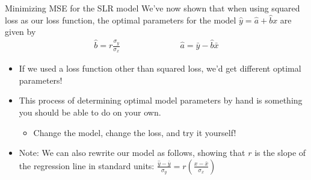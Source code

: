 \documentclass[aspectratio=169]{../latex_main/tntbeamer}  %
\begin{document}
	
	\begin{frame}{Minimizing MSE for the SLR model}
	       We’ve now shown that when using squared loss as our loss function, the optimal parameters for the model            $\hat{y} = \hat{a} + \hat{b}x$        are given by
                \begin{align*}
	                \hat{b} = r\frac{\sigma_y}{\sigma_x}
	                \hspace{3cm}
	                \hat{a} = \bar{y} - \hat{b}\bar{x}
                 \end{align*}

            	\begin{itemize}
            	    \item If we used a loss function other than squared loss, we’d get different optimal parameters!
            	    \item This process of determining optimal model parameters by hand is something you should be able to do on your own.
            	    \begin{itemize}
            	        \item Change the model, change the loss, and try it yourself!
            	    \end{itemize}
            	    \item Note: We can also rewrite our model as follows, showing that $r$ is the slope of the regression line in standard units: $\frac{\hat{y}-\bar{y}}{\sigma_y} = r\left(\frac{x-\bar{x}}{\sigma_x}\right)$
            	\end{itemize}
	\end{frame}
\end{document}
